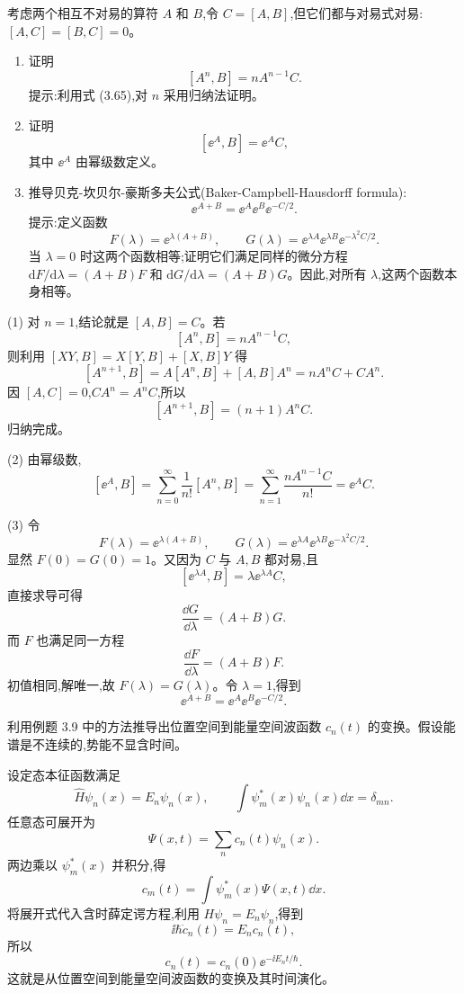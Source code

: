 \begin{question}
考虑两个相互不对易的算符 $A$ 和 $B$,令 $C=[A,B]$,但它们都与对易式对易:$[A,C]=[B,C]=0$。
\begin{enumerate}
\item 证明
\[
[A^n,B]=nA^{n-1}C.
\]
提示:利用式 (3.65),对 $n$ 采用归纳法证明。
\item 证明
\[
[\mathrm \ee^A,B]=\mathrm \ee^A C,
\]
其中 $\mathrm \ee^A$ 由幂级数定义。
\item 推导贝克-坎贝尔-豪斯多夫公式(Baker-Campbell-Hausdorff formula):
\[
\mathrm \ee^{A+B}=\mathrm \ee^A\mathrm \ee^B\mathrm \ee^{-C/2}.
\]
提示:定义函数
\[
F(\lambda)=\mathrm \ee^{\lambda(A+B)},\qquad
G(\lambda)=\mathrm \ee^{\lambda A}\mathrm \ee^{\lambda B}\mathrm \ee^{-\lambda^2C/2}.
\]
当 $\lambda=0$ 时这两个函数相等;证明它们满足同样的微分方程 $\mathrm dF/\mathrm d\lambda=(A+B)F$ 和 $\mathrm dG/\mathrm d\lambda=(A+B)G$。因此,对所有 $\lambda$,这两个函数本身相等。
\end{enumerate}

\par\smallskip
{}

\end{question}
\begin{solution}
(1) 对 $n=1$,结论就是 $[A,B]=C$。若
\[
[A^n,B]=nA^{n-1}C,
\]
则利用 $[XY,B]=X[Y,B]+[X,B]Y$ 得
\[
[A^{n+1},B]=A[A^n,B]+[A,B]A^n
=nA^nC+CA^n.
\]
因 $[A,C]=0$,$CA^n=A^nC$,所以
\[
[A^{n+1},B]=(n+1)A^nC.
\]
归纳完成。

(2) 由幂级数,
\[
[\ee^A,B]=\sum_{n=0}^{\infty}\frac1{n!}[A^n,B]
=\sum_{n=1}^{\infty}\frac{nA^{n-1}C}{n!}
=\ee^A C.
\]

(3) 令
\[
F(\lambda)=\ee^{\lambda(A+B)},
\qquad
G(\lambda)=\ee^{\lambda A}\ee^{\lambda B}\ee^{-\lambda^2C/2}.
\]
显然 $F(0)=G(0)=1$。又因为 $C$ 与 $A,B$ 都对易,且
\[
[\ee^{\lambda A},B]=\lambda \ee^{\lambda A}C,
\]
直接求导可得
\[
\frac{\dd G}{\dd\lambda}=(A+B)G.
\]
而 $F$ 也满足同一方程
\[
\frac{\dd F}{\dd\lambda}=(A+B)F.
\]
初值相同,解唯一,故 $F(\lambda)=G(\lambda)$。令 $\lambda=1$,得到
\[
\boxed{\ee^{A+B}=\ee^A\ee^B\ee^{-C/2}.}
\]
\end{solution}

\begin{question}
利用例题 3.9 中的方法推导出位置空间到能量空间波函数 $c_n(t)$ 的变换。假设能谱是不连续的,势能不显含时间。
\end{question}
\begin{solution}
设定态本征函数满足
\[
\hat H\psi_n(x)=E_n\psi_n(x),
\qquad
\int\psi_m^*(x)\psi_n(x)\dd x=\delta_{mn}.
\]
任意态可展开为
\[
\Psi(x,t)=\sum_n c_n(t)\psi_n(x).
\]
两边乘以 $\psi_m^*(x)$ 并积分,得
\[
\boxed{c_m(t)=\int\psi_m^*(x)\Psi(x,t)\dd x.}
\]
将展开式代入含时薛定谔方程,利用 $H\psi_n=E_n\psi_n$,得到
\[
\ii\hbar\dot c_n(t)=E_n c_n(t),
\]
所以
\[
\boxed{c_n(t)=c_n(0)\ee^{-\ii E_nt/\hbar}.}
\]
这就是从位置空间到能量空间波函数的变换及其时间演化。
\end{solution}

